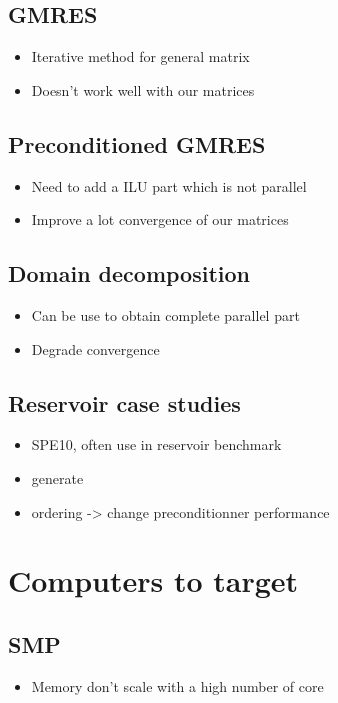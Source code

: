 \documentclass[oneside,12t]{classes/Thesis}
\begin{document}
\subsection{GMRES}
  \begin{itemize}
    \item Iterative method for general matrix
    \item Doesn't work well with our matrices
  \end{itemize}
\subsection{Preconditioned GMRES}
  \begin{itemize}
    \item Need to add a ILU part which is not parallel
    \item Improve a lot convergence of our matrices
  \end{itemize}
\subsection{Domain decomposition}
  \begin{itemize}
    \item Can be use to obtain complete parallel part
    \item Degrade convergence
  \end{itemize}
\subsection{Reservoir case studies}
  \begin{itemize}
    \item SPE10, often use in reservoir benchmark
    \item generate
    \item ordering -> change preconditionner performance
  \end{itemize}



\section{Computers to target}
\subsection{SMP}
  \begin{itemize}
    \item Memory don't scale with a high number of core
  \end{itemize}
\end{document}

